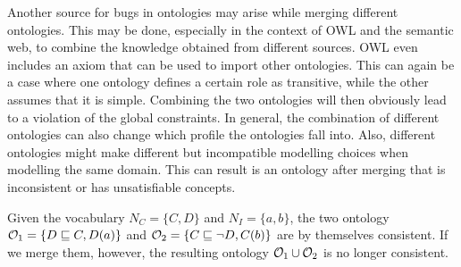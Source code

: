 Another source for bugs in ontologies may arise while merging different ontologies. This may be done, especially in the context of OWL and the semantic web, to combine the knowledge obtained from different sources. OWL even includes an axiom that can be used to import other ontologies. This can again be a case where one ontology defines a certain role as transitive, while the other assumes that it is simple. Combining the two ontologies will then obviously lead to a violation of the global constraints. In general, the combination of different ontologies can also change which profile the ontologies fall into. Also, different ontologies might make different but incompatible modelling choices when modelling the same domain. This can result is an ontology after merging that is inconsistent or has unsatisfiable concepts.

\begin{example}
Given the vocabulary $N_C = \{ C, D \}$ and $N_I = \{ a, b \}$, the two \SROIQ ontology $\mathcal{O}_1 = \{ D \sqsubseteq C, D(a) \}$ and $\mathcal{O}_2 = \{ C \sqsubseteq \lnot D, C(b) \}$ are by themselves consistent. If we merge them, however, the resulting ontology $\mathcal{O}_1 \cup \mathcal{O}_2$ is no longer consistent.
\end{example}


